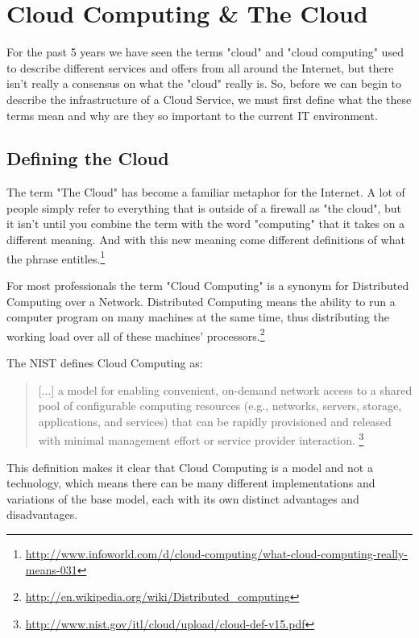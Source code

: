 \chapter{Cloud Computing \& The Cloud}\label{ch:infrastructure}
For the past 5 years we have seen the terms "cloud" and "cloud computing" used to describe different services and offers from all around the Internet, but there isn't really a consensus on what the "cloud" really is. So, before we can begin to describe the infrastructure of a Cloud Service, we must first define what the these terms mean and why are they so important to the current IT environment.

\section{Defining the Cloud}
The term "The Cloud" has become a familiar metaphor for the Internet. A lot of people simply refer to everything that is outside of a firewall as "the cloud", but it isn't until you combine the term with the word "computing" that it takes on a different meaning. And with this new meaning come different definitions of what the phrase entitles.\footnote{\url{http://www.infoworld.com/d/cloud-computing/what-cloud-computing-really-means-031}}

For most professionals the term "Cloud Computing" is a synonym for Distributed Computing over a Network. Distributed Computing means the ability to run a computer program on many machines at the same time, thus distributing the working load over all of these machines' processors.\footnote{\url{http://en.wikipedia.org/wiki/Distributed_computing}}

The \ac{NIST} defines Cloud Computing as:
\begin{quotation}
[...] a model for enabling convenient, on-demand network access to a shared pool of configurable computing resources (e.g., networks, servers, storage, applications, and services) that can be rapidly provisioned and released with minimal management effort or service provider interaction.
\footnote{\url{http://www.nist.gov/itl/cloud/upload/cloud-def-v15.pdf}} 
\end{quotation}

This definition makes it clear that Cloud Computing is a model and not a technology, which means there can be many different implementations and variations of the base model, each with its own distinct advantages and disadvantages.

